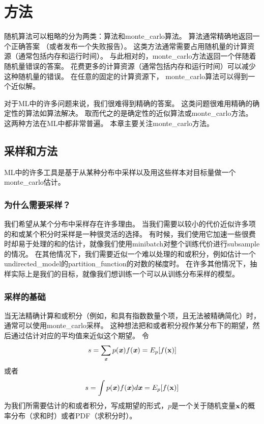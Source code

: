 \chapter{方法}
\label{chap:monte_carlo_methods}

随机算法可以粗略的分为两类：算法和\gls{monte_carlo}算法。
算法通常精确地返回一个正确答案 （或者发布一个失败报告）。
这类方法通常需要占用随机量的计算资源（通常包括内存和运行时间）。
与此相对的，\gls{monte_carlo}方法返回一个伴随着随机量错误的答案。
花费更多的计算资源（通常包括内存和运行时间）可以减少这种随机量的错误。
在任意的固定的计算资源下， \gls{monte_carlo}算法可以得到一个近似解。

对于\gls{ML}中的许多问题来说，我们很难得到精确的答案。
这类问题很难用精确的确定性的算法如算法解决。
取而代之的是确定性的近似算法或\gls{monte_carlo}方法。
这两种方法在\gls{ML}中都非常普遍。
本章主要关注\gls{monte_carlo}方法。

\section{采样和方法}
\label{sec:sampling_and_monte_carlo_methods}

\gls{ML}中的许多工具是基于从某种分布中采样以及用这些样本对目标量做一个\gls{monte_carlo}估计。

\subsection{为什么需要采样？}
\label{sec:why_sampling}

我们希望从某个分布中采样存在许多理由。
当我们需要以较小的代价近似许多项的和或某个积分时采样是一种很灵活的选择。
有时候，我们使用它加速一些很费时却易于处理的和的估计，就像我们使用\gls{minibatch}对整个训练代价进行\gls{subsample}的情况。
在其他情况下，我们需要近似一个难以处理的和或积分，例如估计一个\gls{undirected_model}的\gls{partition_function}的对数的梯度时。
在许多其他情况下，抽样实际上是我们的目标，就像我们想训练一个可以从训练分布采样的模型。

\subsection{采样的基础}
\label{sec:basics_of_monte_carlo_sampling}

当无法精确计算和或积分（例如，和具有指数数量个项，且无法被精确简化）时，通常可以使用\gls{monte_carlo}采样。
这种想法把和或者积分视作某分布下的期望，然后通过估计对应的平均值来近似这个期望。
令
\begin{align}
s = \sum_{\boldsymbol{\mathit{x}}} p(\boldsymbol{\mathit{x}})f(\boldsymbol{\mathit{x}}) = E_p[f(\mathbf{x})]
\end{align}
或者
\begin{align}
\label{eqn:integra}
s = \int p(\boldsymbol{\mathit{x}})f(\boldsymbol{\mathit{x}})d\boldsymbol{\mathit{x}} = E_p[f(\mathbf{x})]
\end{align}
为我们所需要估计的和或者积分，写成期望的形式，$p$是一个关于随机变量$\mathbf{x}$的概率分布（求和时）或者\gls{PDF}（求积分时）。

